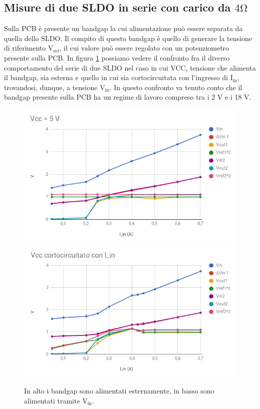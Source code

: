 \subsection{Misure di due SLDO in serie con carico da $\mathrm{4 \Omega}$}

Sulla PCB è presente un bandgap la cui alimentazione può essere separata da quella dello SLDO. Il compito di questo bandgap è quello di generare la tensione di riferimento $\mathrm{V_{ref}}$, il cui valore può essere regolato con un potenziometro presente sulla PCB.
In figura \ref{SLDO5Serie} possiamo vedere il confronto fra il diverso comportamento del serie di due SLDO nel caso in cui VCC, tensione che alimenta il bandgap, sia esterna e quello in cui sia cortocircuitata con l'ingresso di $\mathrm{I_{in}}$, trovandosi, dunque, a tensione $\mathrm{V_{in}}$.
In questo confronto va tenuto conto che il bandgap presente sulla PCB ha un regime di lavoro compreso tra i 2 V e i 18 V. 
\begin{figure}
\centering
\includegraphics[width=.85\textwidth]{Immagini/SLDO5Serie1}
\includegraphics[width=.85\textwidth]{Immagini/SLDO5Serie2}
\caption{In alto i bandgap sono alimentati esternamente, in basso sono alimentati tramite $\mathrm{V_{in}}$.}
\label{SLDO5Serie}
\end{figure}
